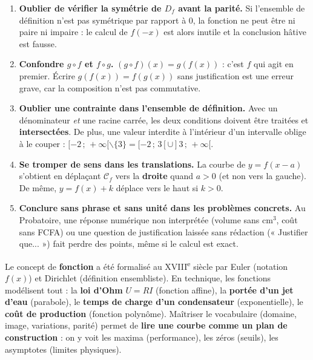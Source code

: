 \documentclass[11pt]{article}
\def\setminus{\mathbin{\backslash}}\let\smallsetminus\setminus
\begin{document}
\begin{attention}
\begin{enumerate}
\item \textbf{Oublier de vérifier la symétrie de $D_f$ avant la parité.} Si l'ensemble de définition n'est pas symétrique par rapport à $0$, la fonction ne peut être ni paire ni impaire : le calcul de $f(-x)$ est alors inutile et la conclusion hâtive est fausse.
\item \textbf{Confondre $g \circ f$ et $f \circ g$.} $(g \circ f)(x) = g(f(x))$ : c'est $f$ qui agit en premier. Écrire $g(f(x)) = f(g(x))$ sans justification est une erreur grave, car la composition n'est pas commutative.
\item \textbf{Oublier une contrainte dans l'ensemble de définition.} Avec un dénominateur \emph{et} une racine carrée, les deux conditions doivent être traitées et \textbf{intersectées}. De plus, une valeur interdite à l'intérieur d'un intervalle oblige à le couper : $[-2\,;\,+\infty[ \setminus \{3\} = [-2\,;\,3[ \cup ]3\,;\,+\infty[$.
\item \textbf{Se tromper de sens dans les translations.} La courbe de $y = f(x - a)$ s'obtient en déplaçant $\mathcal{C}_f$ vers la \textbf{droite} quand $a > 0$ (et non vers la gauche). De même, $y = f(x) + k$ déplace vers le haut si $k > 0$.
\item \textbf{Conclure sans phrase et sans unité dans les problèmes concrets.} Au Probatoire, une réponse numérique non interprétée (volume sans cm$^3$, coût sans FCFA) ou une question de justification laissée sans rédaction (« Justifier que... ») fait perdre des points, même si le calcul est exact.
\end{enumerate}
\end{attention}

\begin{savaistu}
Le concept de \textbf{fonction} a été formalisé au XVIII\textsuperscript{e} siècle par Euler (notation $f(x)$) et Dirichlet (définition ensembliste). En technique, les fonctions modélisent tout : la \textbf{loi d'Ohm} $U = RI$ (fonction affine), la \textbf{portée d'un jet d'eau} (parabole), le \textbf{temps de charge d'un condensateur} (exponentielle), le \textbf{coût de production} (fonction polynôme). Maîtriser le vocabulaire (domaine, image, variations, parité) permet de \textbf{lire une courbe comme un plan de construction} : on y voit les maxima (performance), les zéros (seuils), les asymptotes (limites physiques).
\end{savaistu}
\end{document}
